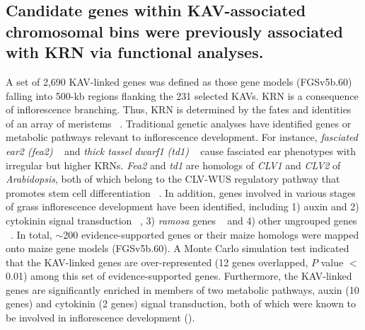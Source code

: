 \documentclass[10pt,letterpaper]{article}
\begin{document}
\subsection*{Candidate genes within KAV-associated chromosomal bins were previously associated with KRN via functional analyses.}
A set of 2,690 KAV-linked genes was defined as those gene models (FGSv5b.60) falling into 500-kb regions flanking the 231 selected KAVs. KRN is a consequence of inflorescence branching. Thus, KRN is determined by the fates and identities of an array of meristems ~\cite{Barazesh2008}. Traditional genetic analyses have identified genes or metabolic pathways relevant to inflorescence development. For instance, \emph{fasciated ear2 (fea2)} ~\cite{Bommert2013} and \emph{thick tassel dwarf1 (td1)} ~\cite{Bommert2005} cause fasciated ear phenotypes with irregular but higher KRNs. \emph{Fea2} and \emph{td1} are homologs of \emph{CLV1} and \emph{CLV2} of \emph{Arabidopsis}, both of which belong to the CLV-WUS regulatory pathway that promotes stem cell differentiation ~\cite{Clark2001}. In addition, genes involved in various stages of grass inflorescence development have been identified, including 1) auxin and 2) cytokinin signal transduction ~\cite{Barazesh2008, Sigmon2010}, 3) \emph{ramosa} genes ~\cite{Bortiri2006} and 4) other ungrouped genes ~\cite{McSteen2001, Upadyayula2006, Xu2011}. In total, $\sim$200 evidence-supported genes or their maize homologs were mapped onto maize gene models (FGSv5b.60). A Monte Carlo simulation test indicated that the KAV-linked genes are over-represented (12 genes overlapped, $P$ value $<$ 0.01) among this set of evidence-supported genes. Furthermore, the KAV-linked genes are significantly enriched in members of two metabolic pathways, auxin (10 genes) and cytokinin (2 genes) signal transduction, both of which were known to be involved in inflorescence development (). 
\end{document}
